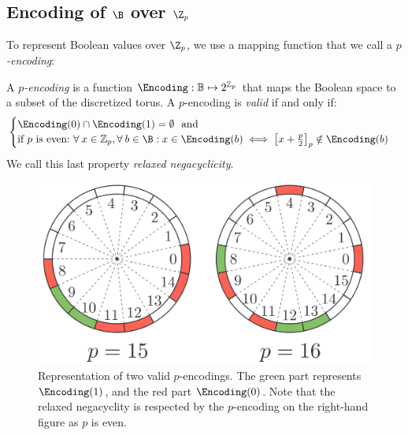\subsection{Encoding of $\B$ over $\Z_p$}

To represent Boolean values over $\Z_p$, we use a mapping function that we call a \emph{$p$-encoding}:

\begin{definition}[$p$-encoding]
    A \emph{$p$-encoding} is a function $\Encoding: \mathbb B \mapsto 2^{\mathbb Z_p}$ that maps the Boolean space to a subset of the discretized torus. A $p$-encoding is \emph{valid} if and only if:
    \begin{equation}
        \begin{cases}
            \Encoding(0) \cap \Encoding(1) = \emptyset~\text{ and}\\
            \text{if $p$ is even:} ~\forall \:x \in \mathbb Z_p, \forall \:b \in \B: x \in \Encoding(b) \iff \left [ x + \frac p 2 \right ]_p \notin \Encoding(b)
        \end{cases}
    \label{def:validity}
    \end{equation}
    We call this last property \emph{relaxed negacyclicity}.
    \label{def:encoding}
\end{definition}


\begin{figure}
  \centering
    \includegraphics[scale=0.2]{images/encoding_example_double.png}

  \caption{Representation of two valid $p$-encodings. The green part represents $\Encoding(1)$,  and the red part $\Encoding(0)$. Note that the relaxed negacyclity is respected by the $p$-encoding on the right-hand figure as $p$ is even.}
  \label{fig:encodings}
\end{figure}


